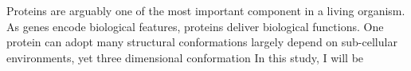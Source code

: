 Proteins are arguably one of the most important component in a living organism. As genes encode biological features, proteins deliver biological functions. One protein can adopt many structural conformations largely depend on sub-cellular environments, yet three dimensional conformation     In this study, I will be 